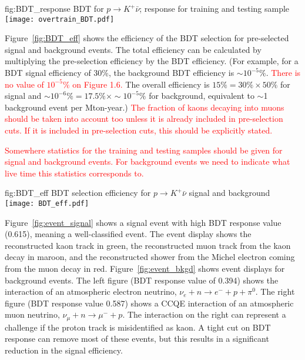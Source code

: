 \begin{dunefigure}
{fig:BDT_response}
{BDT for $p\rightarrow K^{+} \bar{\nu}$; response for training and testing sample}
\texttt{[image: overtrain\_BDT.pdf]}
\end{dunefigure} 

Figure~\ref{fig:BDT_eff} shows the efficiency of the BDT selection for pre-selected signal and background events. The total efficiency can be calculated by multiplying the pre-selection efficiency by the BDT efficiency.  (For example, for a BDT signal efficiency of 30\%, the background BDT efficiency is $\sim 10^{-5}\%$.  \textcolor{red}{There is no value of $10^{-5}\%$ on Figure 1.6.} The overall efficiency is $15\% = 30\% \times 50\%$ for signal and $\sim10^{-6} \% = 17.5\% \times \sim 10^{-5}\%$ for background, equivalent to $\sim$1 background event per Mton-year.) \textcolor{red}{The fraction of kaons decaying into muons should be taken into account too unless it is already included in pre-selection cuts. If it is included in pre-selection cuts, this should be explicitly stated.}

\textcolor{red}{Somewhere statistics for the training and testing samples should be given for signal and background events. For background events we need to indicate what live time this statistics corresponds to.}

\begin{dunefigure}
{fig:BDT_eff}
{BDT selection efficiency for $p\rightarrow K^{+} \bar{\nu}$ signal and background}
\texttt{[image: BDT\_eff.pdf]}
\end{dunefigure} 

Figure~\ref{fig:event_signal} shows a signal event with high BDT response value (0.615), meaning a well-classified event. The event display shows the reconstructed kaon track in green, the reconstructed muon track from the kaon decay in maroon, and the reconstructed shower from the Michel electron coming from the muon decay in red. Figure~\ref{fig:event_bkgd} shows event displays for background events.  The left figure (BDT response value of 0.394) shows the interaction of an atmospheric electron neutrino, $\nu_{e}+n\rightarrow e^{-}+p+\pi^{0}$. The right figure (BDT response value 0.587) shows a CCQE interaction of an atmospheric muon neutrino, $\nu_{\mu}+n \rightarrow \mu^{-}+p$. The interaction on the right can represent a challenge if the proton track is misidentified as kaon. A tight cut on BDT response can remove most of these events, but this results in a significant reduction in the signal efficiency.

